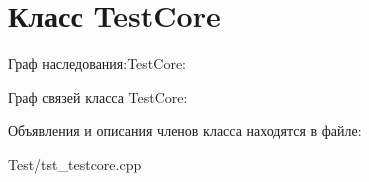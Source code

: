 \hypertarget{classTestCore}{}\section{Класс Test\+Core}
\label{classTestCore}


Граф наследования\+:Test\+Core\+:


Граф связей класса Test\+Core\+:


Объявления и описания членов класса находятся в файле\+:\begin{DoxyCompactItemize}
\item 
Test/tst\+\_\+testcore.\+cpp\end{DoxyCompactItemize}
